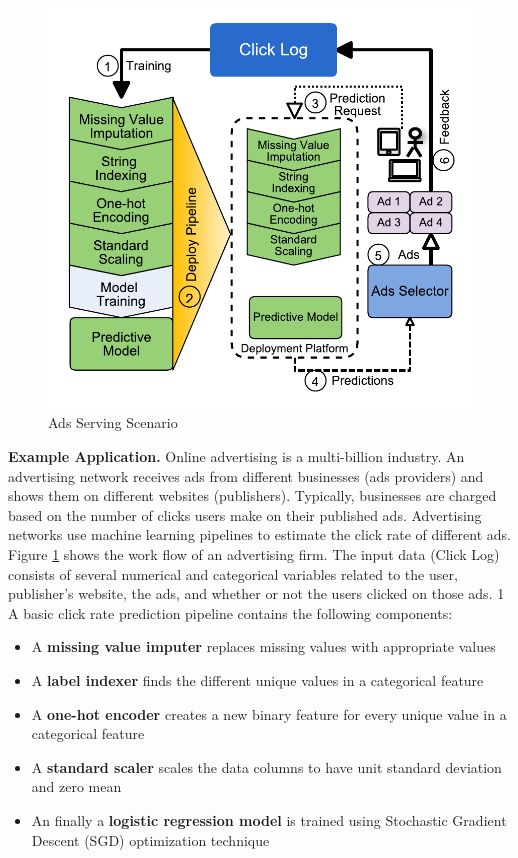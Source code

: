 \begin{figure}[t]
\centering
\includegraphics[width=\columnwidth]{../images/motivational-example.pdf}
\caption{Ads Serving Scenario}
\label{fig:motivational-example}
\end{figure}
\textbf{Example Application.} 
Online advertising is a multi-billion industry.
An advertising network receives ads from different businesses (ads providers) and shows them on different websites (publishers).
Typically, businesses are charged based on the number of clicks users make on their published ads.
Advertising networks use machine learning pipelines to estimate the click rate of different ads.
Figure \ref{fig:motivational-example} shows the work flow of an advertising firm.
The input data (Click Log) consists of several numerical and categorical variables related to the user, publisher's website,  the ads,  and whether or not the users clicked on those ads.
\textcircled{1} A basic click rate prediction pipeline contains the following components:
\begin{itemize}
\item A \textbf{missing value imputer} replaces missing values with appropriate values
\item A \textbf{label indexer} finds the different unique values in a categorical feature 
\item A \textbf{one-hot encoder} creates a new binary feature for every unique value in a categorical feature
\item A \textbf{standard scaler} scales the data columns to have unit standard deviation and zero mean
\item An finally a \textbf{logistic regression model} is trained using Stochastic Gradient Descent (SGD) optimization technique
\end{itemize}
